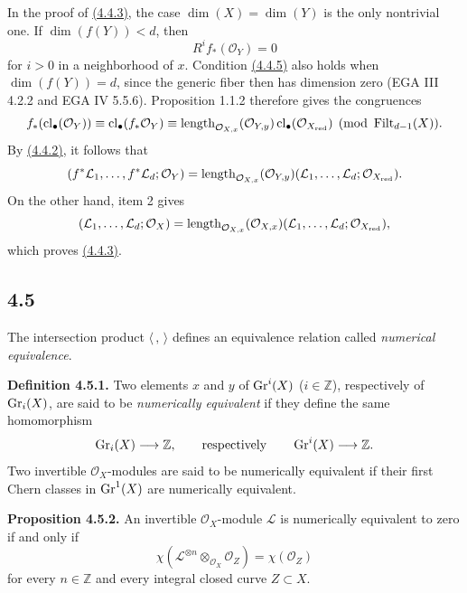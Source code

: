 In the proof of \hyperlink{sga6.e10.eq.4-4-3}{(4.4.3)}, the case $\dim(X)=\dim(Y)$ is the only nontrivial
one. If $\dim(f(Y))<d$, then
\begin{equation}\tag{4.4.5}
R^if_*(\mathcal O_Y)=0
\end{equation}
for $i>0$ in a neighborhood of $x$. Condition \hyperlink{sga6.e10.eq.4-4-5}{(4.4.5)} also holds when
$\dim(f(Y))=d$, since the generic fiber then has dimension zero (EGA III
4.2.2 and EGA IV 5.5.6). Proposition 1.1.2 therefore gives the congruences
\[
f_*(\operatorname{cl}_\bullet(\mathcal O_Y))
\equiv\operatorname{cl}_\bullet(f_*\mathcal O_Y)
\equiv\operatorname{length}_{\mathcal O_{X,x}}(\mathcal O_{Y,y})
\operatorname{cl}_\bullet(\mathcal O_{X_{\mathrm{red}}})
\pmod{\operatorname{Filt}_{d-1}(X)}.
\]
By \hyperlink{sga6.e10.eq.4-4-2}{(4.4.2)}, it follows that
\[
(f^*\mathcal L_1,\ldots,f^*\mathcal L_d;\mathcal O_Y)
=\operatorname{length}_{\mathcal O_{X,x}}(\mathcal O_{Y,y})
(\mathcal L_1,\ldots,\mathcal L_d;\mathcal O_{X_{\mathrm{red}}}).
\]
On the other hand, item 2 gives
\[
(\mathcal L_1,\ldots,\mathcal L_d;\mathcal O_X)
=\operatorname{length}_{\mathcal O_{X,x}}(\mathcal O_{X,x})
(\mathcal L_1,\ldots,\mathcal L_d;\mathcal O_{X_{\mathrm{red}}}),
\]
which proves \hyperlink{sga6.e10.eq.4-4-3}{(4.4.3)}.

\subsection*{4.5}
The intersection product $\langle\, ,\,\rangle$ defines an equivalence
relation called \emph{numerical equivalence}.

\textbf{Definition 4.5.1.}
Two elements $x$ and $y$ of $\operatorname{Gr}^i(X)$ ($i\in\mathbb Z$), respectively of
$\operatorname{Gr}_i(X)$, are said to be \emph{numerically equivalent} if they define the
same homomorphism
\[
\operatorname{Gr}_i(X)\longrightarrow\mathbb Z,
\qquad\text{respectively}\qquad
\operatorname{Gr}^i(X)\longrightarrow\mathbb Z.
\]
Two invertible $\mathcal O_X$-modules are said to be numerically equivalent
if their first Chern classes in $\operatorname{Gr}^1(X)$ are numerically equivalent.

\textbf{Proposition 4.5.2.}
An invertible $\mathcal O_X$-module $\mathcal L$ is numerically equivalent to
zero if and only if
\begin{equation}\tag{4.5.3}
\chi(\mathcal L^{\otimes n}\otimes_{\mathcal O_X}\mathcal O_Z)
=\chi(\mathcal O_Z)
\end{equation}
for every $n\in\mathbb Z$ and every integral closed curve $Z\subset X$.

